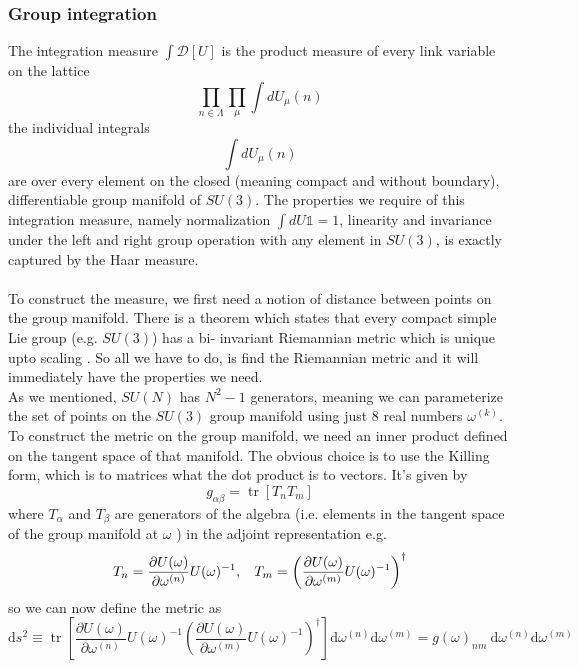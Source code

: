 \documentclass[a4paper,10pt]{article}
\begin{document}
\subsubsection{Group integration}
The integration measure $\int \mathcal{D}[U]$ is the product measure of every link variable on the lattice
\begin{equation}
\prod\limits_{n\in \Lambda}\prod\limits_{\mu}\int dU_\mu(n)
\end{equation}
the individual integrals
\begin{equation}
\int dU_\mu(n)
\end{equation}
are over every element on the closed (meaning compact and without boundary), differentiable group manifold of $SU(3)$. The properties we require of this integration measure, namely normalization $\int dU \mathbb{1} = 1$, linearity and invariance under the left and right group operation with any element in $SU(3)$, is exactly captured by the Haar measure.\\\\To construct the measure, we first need a notion of distance between points on the group manifold. There is a theorem which states that every compact simple Lie group (e.g. $SU(3)$) has a bi- invariant Riemannian metric which is unique upto scaling \cite{Gallier2020}. So all we have to do, is find the Riemannian metric and it will immediately have the properties we need.\\ As we mentioned, $SU(N)$ has $N^2-1$ generators, meaning we can parameterize the set of points on the $SU(3)$ group manifold using just $8$ real numbers $\omega^{(k)}$. To construct the metric on the group manifold, we need an inner product defined on the tangent space of that manifold. The obvious choice is to use the Killing form, which is to matrices what the dot product is to vectors. It's given by 
\begin{equation}
g_{\alpha\beta} = \operatorname{tr}\left[ T_n T_m \right]
\end{equation}
where $T_\alpha$ and  $T_\beta$ are generators of the algebra (i.e. elements in the tangent space of the group manifold at $\omega$ ) in the adjoint representation e.g. 
\begin{equation}
 T_n = \frac{\partial U(\omega)}{\partial \omega^{(n)}} U(\omega)^{-1},\hspace{3mm} T_m = \left(\frac{\partial U(\omega)}{\partial \omega^{(m)}} U(\omega)^{-1}\right)^{\dagger}
\end{equation}
so we can now define the metric as
\begin{equation}
\mathrm{d} s^{2} \equiv \operatorname{tr}\left[\frac{\partial U(\omega)}{\partial \omega^{(n)}} U(\omega)^{-1}\left(\frac{\partial U(\omega)}{\partial \omega^{(m)}} U(\omega)^{-1}\right)^{\dagger}\right] \mathrm{d} \omega^{(n)} \mathrm{d} \omega^{(m)}=g(\omega)_{n m} \mathrm{~d} \omega^{(n)} \mathrm{d} \omega^{(m)}
\end{equation}
\end{document}
